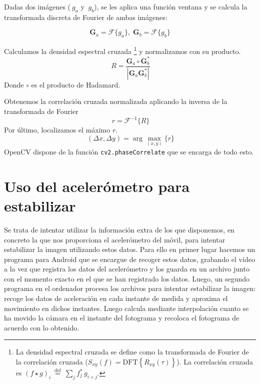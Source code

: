 \documentclass[a4paper,openright, 12pt]{book}
\begin{document}
Dadas dos imágenes ($\ g_a$ y $\ g_b$), se les aplica una función ventana y se calcula la transformada discreta de Fourier de ambas imágenes:
  
\begin{equation*} 
    \mathbf{G}_a = \mathcal{F}\{g_a\}, \; \mathbf{G}_b = \mathcal{F}\{g_b\}
\end{equation*}

Calculamos la densidad espectral cruzada \footnote{La densidad espectral cruzada se define como la transformada de Fourier de la correlación cruzada ($ 
    S_{xy}(f)=\mbox{DFT}\left\{R_{xy}(\tau)\right\} $).
La correlación cruzada es 
    $(f\star g)_i \ \stackrel{\mathrm{def}}{=}\ \sum_j f^*_j\,g_{i+j}$.    
     } y normalizamos con su producto.
\begin{equation*}
   \ R = \frac{ \mathbf{G}_a \circ \mathbf{G}_b^*}{|\mathbf{G}_a \mathbf{G}_b^*|}
\end{equation*}
Donde $\circ$ es el producto de Hadamard.

Obtenemos la correlación cruzada normalizada aplicando la inversa de la transformada de Fourier
\begin{equation*}
    \ r = \mathcal{F}^{-1}\{R\}
\end{equation*}
Por último, localizamos el máximo  $r$.
\begin{equation*}
    \ (\Delta x, \Delta y) = \arg \max_{(x, y)}\{r\} 
\end{equation*}
OpenCV dispone de la función \lstinline|cv2.phaseCorrelate| que se encarga de todo esto.
\newpage
\section{Uso del acelerómetro para estabilizar}
Se trata de intentar utilizar la información extra de los que disponemos, en concreto la que nos proporciona el acelerómetro del móvil, para intentar estabilizar la imagen utilizando estos datos.
Para ello en primer lugar hacemos un programa para Android que se encargue de recoger estos datos, grabando el vídeo a la vez que registra los datos del acelerómetro y los guarda en un archivo junto con el momento exacto en el que se han registrado los datos.
Luego, un segundo programa en el ordenador procesa los archivos para intentar estabilizar la imagen: recoge los datos de aceleración en cada instante de medida y aproxima el movimiento en dichos instantes. Luego calcula mediante interpolación cuanto se ha movido la cámara en el instante del fotograma y recoloca el fotograma de acuerdo con lo obtenido.
\end{document}
